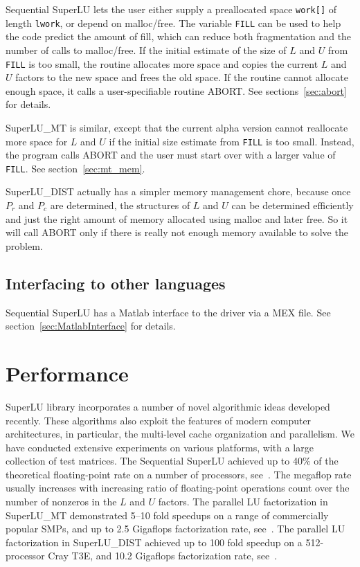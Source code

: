 Sequential SuperLU lets the user either supply a preallocated space
{\tt work[]} of length {\tt lwork}, or depend on malloc/free. The variable
{\tt FILL} can be used to help the code predict the amount of fill,
which can reduce both fragmentation and the number of calls to malloc/free.
If the initial estimate of the size of $L$ and $U$ from {\tt FILL} is
too small, the routine allocates more space and copies the current $L$ and
$U$ factors to the new space and frees the old space.
If the routine cannot allocate enough space, it calls a user-specifiable
routine ABORT. See sections~\ref{sec:abort} for details.

SuperLU\_MT is similar, except that the current alpha version cannot reallocate
more space for $L$ and $U$ if the initial size estimate from {\tt FILL}
is too small. Instead, the program calls ABORT and the user must start over
with a larger value of {\tt FILL}. See section~\ref{sec:mt_mem}.

SuperLU\_DIST actually has a simpler memory management chore, because
once $P_r$ and $P_c$ are determined, the structures of $L$ and $U$
can be determined efficiently and just the right amount of memory
allocated using malloc and later free. So it will call ABORT only if
there is really not enough memory available to solve the problem.


\subsection{Interfacing to other languages}

Sequential SuperLU has a Matlab interface to the driver via a MEX file.
See section~\ref{sec:MatlabInterface} for details.


\section{Performance}
\label{sec:perf}
SuperLU library incorporates a number of novel algorithmic ideas
developed recently. These algorithms also exploit the features
of modern computer architectures, in particular, the multi-level
cache organization and parallelism.
We have conducted extensive experiments on various platforms, 
with a large collection of test matrices.
The Sequential SuperLU achieved up to 40\% of the theoretical floating-point
rate on a number of processors, see~\cite{superlu99,li96}.
The megaflop rate usually increases with increasing ratio of floating-point
operations count over the number of nonzeros in the $L$ and $U$ factors.
The parallel LU factorization in SuperLU\_MT demonstrated 5--10 fold
speedups on a range of commercially popular SMPs, and up
to 2.5 Gigaflops factorization rate, see~\cite{superlu_smp99,li96}.
The parallel LU factorization in SuperLU\_DIST achieved up to 100 fold
speedup on a 512-processor Cray T3E, and 10.2 Gigaflops factorization rate,
see~\cite{lidemmel98}.


